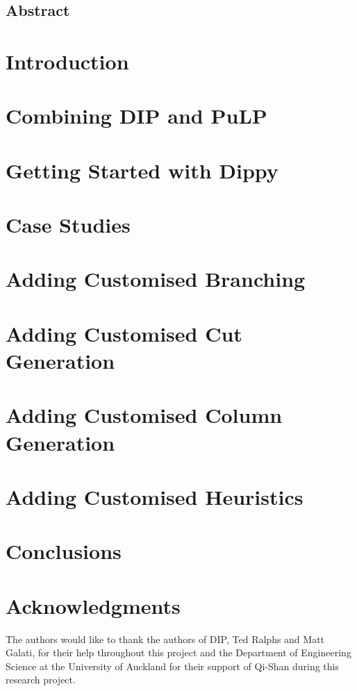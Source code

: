 \documentclass[12pt,a4paper,onecolumn,twoside]{article}
\begin{document}
\subsection*{Abstract}


\section{Introduction} \label{scn:intro}


\section{Combining \ac{DIP} and PuLP} \label{scn:overview}


\section{Getting Started with Dippy}


\section{Case Studies} \label{scn:define}


\section{Adding Customised Branching} \label{scn:branch}


\section{Adding Customised Cut Generation} \label{scn:cuts}


\section{Adding Customised Column Generation} \label{scn:column}


\section{Adding Customised Heuristics} \label{scn:heuristics}


\section{Conclusions} \label{scn:concl}


\section{Acknowledgments}

The authors would like to thank the authors of \ac{DIP}, Ted Ralphs and Matt Galati, for their help throughout this project and the Department of Engineering Science at the University of Auckland for their support of Qi-Shan during this research project.

\vspace*{-0.5\baselineskip}


\end{document}
